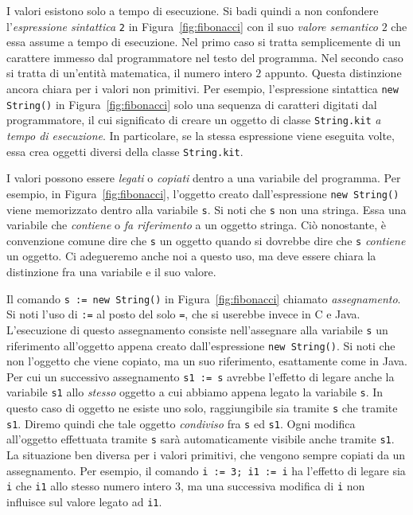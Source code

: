 %
I valori esistono solo a tempo di esecuzione. Si badi quindi a non confondere
l'\emph{espressione sintattica} \texttt{2} in Figura~\ref{fig:fibonacci} con il
suo \emph{valore semantico} $2$ che essa assume a tempo di esecuzione. Nel
primo caso si tratta semplicemente di un carattere immesso dal programmatore
nel testo del programma. Nel secondo caso si tratta di un'entit\`a matematica,
il numero intero $2$ appunto. Questa distinzione \e ancora \piu chiara per
i valori non primitivi. Per esempio, l'espressione sintattica
\texttt{new String()} in Figura~\ref{fig:fibonacci} \e solo una sequenza
di caratteri digitati dal programmatore, il cui significato \e di creare
un oggetto di classe \texttt{String.kit} \emph{a tempo di esecuzione}.
In particolare, se la stessa espressione viene eseguita \piu volte,
essa crea \piu oggetti diversi della classe \texttt{String.kit}.
%

I valori possono essere \emph{legati} o \emph{copiati} dentro a una variabile
del programma. Per esempio, in Figura~\ref{fig:fibonacci}, l'oggetto creato
dall'espressione \texttt{new String()} viene memorizzato dentro alla variabile
\texttt{s}. Si noti che \texttt{s} non \e una stringa. Essa \e una variabile
che \emph{contiene} o \emph{fa riferimento} a un oggetto stringa.
Ci\`o nonostante, \`e convenzione comune
dire che \texttt{s} \emph{\e} un oggetto quando
si dovrebbe dire che \texttt{s} \emph{contiene} un oggetto. Ci adegueremo anche
noi a questo uso, ma deve essere chiara la distinzione fra una variabile e il suo valore.

Il comando \texttt{s := new String()} in Figura~\ref{fig:fibonacci} \e
chiamato \emph{assegnamento}. Si noti l'uso di \texttt{:=} al posto del
solo \texttt{=}, che si userebbe invece in C e Java. L'esecuzione di questo
assegnamento consiste nell'assegnare alla variabile \texttt{s} un riferimento
all'oggetto appena creato dall'espressione \texttt{new String()}.
Si noti che non \e l'oggetto che viene copiato, ma un suo riferimento,
esattamente come in Java. Per cui un successivo assegnamento
\texttt{s1 := s} avrebbe l'effetto di legare anche la variabile
\texttt{s1} allo \emph{stesso} oggetto a cui abbiamo appena legato
la variabile \texttt{s}. In questo caso di oggetto ne esiste uno solo,
raggiungibile sia tramite \texttt{s} che tramite \texttt{s1}. Diremo quindi
che tale oggetto \e \emph{condiviso} fra \texttt{s} ed \texttt{s1}.
Ogni modifica all'oggetto effettuata tramite \texttt{s} sar\`a automaticamente
visibile anche tramite \texttt{s1}.
La situazione \e ben diversa per i valori primitivi, che vengono sempre copiati
da un assegnamento. Per esempio, il comando
\texttt{i := 3; i1 := i} ha l'effetto di legare sia \texttt{i} che \texttt{i1}
allo stesso numero intero $3$, ma una successiva modifica di \texttt{i}
non influisce sul valore legato ad \texttt{i1}.
%

